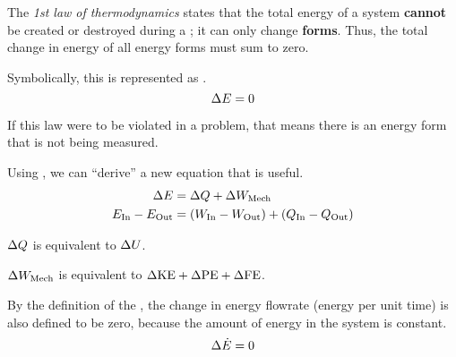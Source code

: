 \begin{definition}\label{def:1st_Law_Thermo}
  The \emph{1st law of thermodynamics} states that the total energy of a system \textbf{cannot} be created or destroyed during a ; it can only change \textbf{forms}.
  Thus, the total change in energy of all energy forms must sum to zero.

  Symbolically, this is represented as .
  \begin{equation}\label{eq:1st_Law_Thermo}
    \Delta E = 0
  \end{equation}

  If this law were to be violated in a problem, that means there is an energy form that is not being measured.

  Using , we can ``derive'' a new equation that is useful.
  \begin{equation*}
    \begin{aligned}
      \Delta E &= \Delta Q + \Delta W_{\mathrm{Mech}} \\
      E_{\mathrm{In}} - E_{\mathrm{Out}} &= (W_{\mathrm{In}} - W_{\mathrm{Out}}) + (Q_{\mathrm{In}} - Q_{\mathrm{Out}}) \\
    \end{aligned}
  \end{equation*}
  \begin{description}[noitemsep]
  \item $\Delta Q$ is equivalent to $\Delta U$.
  \item $\Delta W_{\mathrm{Mech}}$ is equivalent to $\Delta \textrm{KE} + \Delta \textrm{PE} + \Delta \textrm{FE}$.
  \end{description}

  \begin{remark}\label{rmk:1st_Law_Thermo_Change_Energy_Flowrate}
    By the definition of the , the change in energy flowrate (energy per unit time) is also defined to be zero, because the amount of energy in the system is constant.
    \begin{equation}\label{eq:1st_Law_Thermo_Energy_Flowrate}
      \Delta \dot{E} = 0
    \end{equation}
  \end{remark}
\end{definition}

